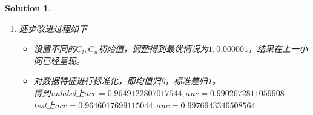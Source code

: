 \documentclass[a4paper,UTF8]{article}
\newtheorem*{solution}{Solution}
\numberwithin{equation}{section}
\begin{document}
\begin{solution}
\begin{enumerate}
    \item 逐步改进过程如下
    \begin{itemize}
        \item 设置不同的$C_l,C_u$初始值，调整得到最优情况为$1,0.000001$，结果在上一小问已经呈现。
        \item 对数据特征进行标准化，即均值归0，标准差归1。\\
        得到unlabel上$acc=0.9649122807017544,auc=0.9902672811059908$\\
        test上$acc=0.9646017699115044,auc=0.9976943346508564$
    \end{itemize}
\end{enumerate}
\end{solution}
\end{document}
